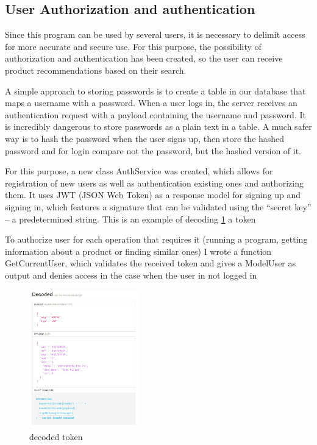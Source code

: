 \documentclass[twoside,twocolumn]{article}
\begin{document}
\subsection{User Authorization and authentication}

Since this program can be used by several users, it is necessary to delimit access
for more accurate and secure use. For this purpose, the possibility of authorization
and authentication has been created, so the user can receive product
recommendations based on their search.

A simple approach to storing passwords is to create a table in our
database that maps a username with a password. When a user logs in, the
server receives an authentication request with a payload containing the
username and password. It is incredibly dangerous to store passwords as
a plain text in a table. A much safer way is to hash the password when
the user signs up, then store the hashed password and for login compare
not the password, but the hashed version of it. 

For this purpose, a new class AuthService was created, which allows for
registration of new users as well as authentication existing ones and
authorizing them. It uses JWT (JSON Web Token)\cite{jones2015json} as a response model
for signing up and signing in, which features a signature that can be
validated using the “secret key” – a predetermined string.\cite{bhanot2015review} This is an
example of decoding \ref{fig:dec} a token 

To authorize user for each operation that requires it (running a program, getting
information about a product or finding similar ones) I wrote a function
GetCurrentUser, which validates the received token and gives a ModelUser as
output and denies access in the case when the user in not logged in

\begin{figure}[h]
\includegraphics[width=1\linewidth, height=6cm]{images/decoded.jpg} 
\caption{decoded token}
\label{fig:dec}
\end{figure}
\end{document}
